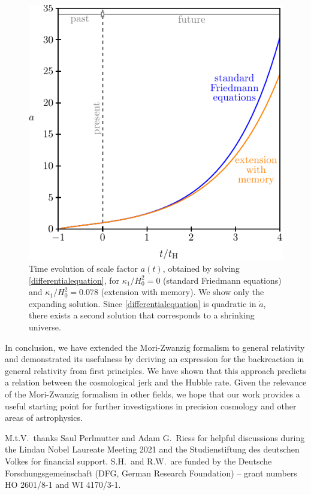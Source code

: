 \documentclass[aps,prl,twocolumn,10pt,superscriptaddress,nofootinbib,balancelastpage]{revtex4-1}
\begin{document}
\begin{figure}
\centering
\includegraphics[width=\linewidth]{fig1}
\caption{\label{fig:1}Time evolution of scale factor $a(t)$, obtained by solving \cref{differentialequation}, for $\kappa_1/H_0^2 = 0$ (standard Friedmann equations) and $\kappa_1/H_0^2 = 0.078$ (extension with memory). We show only the expanding solution. Since \cref{differentialequation} is quadratic in $\dot{a}$, there exists a second solution that corresponds to a shrinking universe.}
\end{figure} 

In conclusion, we have extended the Mori-Zwanzig formalism to general relativity and demonstrated its usefulness by deriving an expression for the backreaction in general relativity from first principles. We have shown that this approach predicts a relation between the cosmological jerk and the Hubble rate. Given the relevance of the Mori-Zwanzig formalism in other fields, we hope that our work provides a useful starting point for further investigations in precision cosmology and other areas of astrophysics. 

\acknowledgments
M.t.V.\ thanks Saul Perlmutter and Adam G.\ Riess for helpful discussions during the Lindau Nobel Laureate Meeting 2021 and the Studienstiftung des deutschen Volkes for financial support. 
S.H.\ and R.W.\ are funded by the Deutsche Forschungsgemeinschaft (DFG, German Research Foundation) -- grant numbers HO 2601/8-1 and WI 4170/3-1.


\nocite{apsrev41Control}


\end{document}
